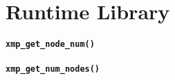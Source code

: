 
\chapter{Runtime Library}

\subsubsection{{\tt xmp\_get\_node\_num()}}

\subsubsection{{\tt xmp\_get\_num\_nodes()}}

